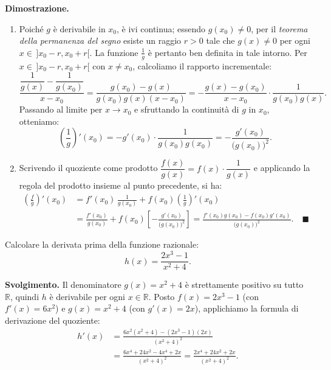 \noindent\textbf{Dimostrazione.}
\begin{enumerate}
    \item Poiché $g$ è derivabile in $x_0$, è ivi continua; essendo $g(x_0) \neq 0$, per il \emph{teorema della permanenza del segno} esiste un raggio $r > 0$ tale che $g(x) \neq 0$ per ogni $x \in \,]x_0 - r, x_0 + r[$. La funzione $\frac{1}{g}$ è pertanto ben definita in tale intorno. Per $x \in \,]x_0 - r, x_0 + r[$ con $x \neq x_0$, calcoliamo il rapporto incrementale:
    \[
        \frac{\dfrac{1}{g(x)} - \dfrac{1}{g(x_0)}}{x - x_0} = \frac{g(x_0) - g(x)}{g(x_0)g(x)(x - x_0)} = -\frac{g(x) - g(x_0)}{x - x_0} \cdot \frac{1}{g(x_0)g(x)}.
    \]
    Passando al limite per $x \to x_0$ e sfruttando la continuità di $g$ in $x_0$, otteniamo:
    \[
        \left(\frac{1}{g}\right)'(x_0) = -g'(x_0) \cdot \frac{1}{g(x_0)g(x_0)} = -\frac{g'(x_0)}{\bigl(g(x_0)\bigr)^2}.
    \]

    \item Scrivendo il quoziente come prodotto $\dfrac{f(x)}{g(x)} = f(x) \cdot \dfrac{1}{g(x)}$ e applicando la regola del prodotto insieme al punto precedente, si ha:
    \begin{align*}
        \left(\frac{f}{g}\right)'(x_0) &= f'(x_0)\,\frac{1}{g(x_0)} + f(x_0)\left(\frac{1}{g}\right)'(x_0) \\
        &= \frac{f'(x_0)}{g(x_0)} + f(x_0)\left[-\frac{g'(x_0)}{\bigl(g(x_0)\bigr)^2}\right] = \frac{f'(x_0)g(x_0) - f(x_0)g'(x_0)}{\bigl(g(x_0)\bigr)^2}. \quad \blacksquare
    \end{align*}
\end{enumerate}

\begin{esbox}
Calcolare la derivata prima della funzione razionale:
\[
    h(x) = \frac{2x^3 - 1}{x^2 + 4}.
\]

\medskip
\noindent\textbf{Svolgimento.}
Il denominatore $g(x) = x^2 + 4$ è strettamente positivo su tutto $\mathbb{R}$, quindi $h$ è derivabile per ogni $x \in \mathbb{R}$. Posto $f(x) = 2x^3 - 1$ (con $f'(x) = 6x^2$) e $g(x) = x^2 + 4$ (con $g'(x) = 2x$), applichiamo la formula di derivazione del quoziente:
\begin{align*}
    h'(x) &= \frac{6x^2(x^2 + 4) - (2x^3 - 1)(2x)}{(x^2 + 4)^2} \\
    &= \frac{6x^4 + 24x^2 - 4x^4 + 2x}{(x^2 + 4)^2} = \frac{2x^4 + 24x^2 + 2x}{(x^2 + 4)^2}.
\end{align*}
\end{esbox}

